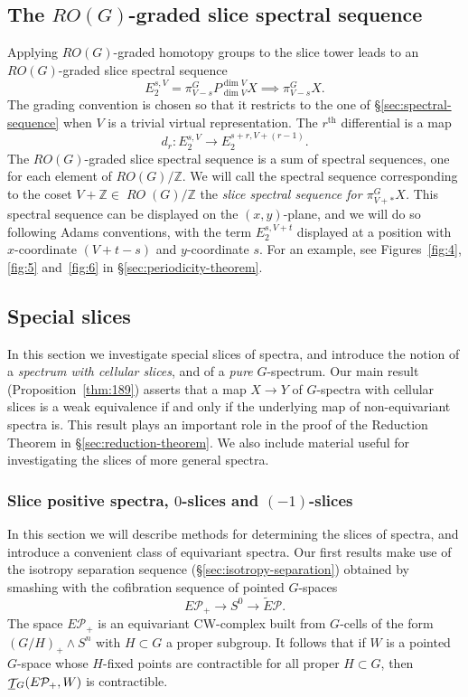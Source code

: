 \documentclass{amsart}
\theoremstyle{definition}
\theoremstyle{remark}
\newcommand{\Z}{{\mathbb Z}}
\newcommand{\slc}[2]{P_{#1}^{#1}#2}
\DeclareMathOperator{\spaces}{\mathcal T}
\newcommand{\gspaces}[1]{\underline{\spaces\mkern-4mu}\mkern4mu_{\!#1}}
\DeclareMathOperator{\RO}{\mathit {RO}}
\newcommand{\pfamily}{\mathcal P}
\begin{document}
\subsection{The $RO(G)$-graded slice spectral sequence}
\label{sec:rog-graded-slice}
Applying $RO(G)$-graded homotopy groups to the slice
tower leads to an $RO(G)$-graded slice spectral sequence
\[
E_{2}^{s,V}= \pi^{G}_{V-s}\slc{\dim V}{X} \implies \pi^{G}_{V-s}X.
\]
The grading convention is chosen so that it restricts to the one of
\S\ref{sec:spectral-sequence} when $V$ is a trivial virtual
representation.  The $r^{\text{th}}$ differential is a map
\[
d_{r}:E_{2}^{s,V} \to E_{2}^{s+r,V+(r-1)}.
\]
The $RO(G)$-graded slice spectral sequence is a sum of spectral
sequences, one for each element of $RO(G)/\Z$.  We will call the
spectral sequence corresponding to the coset $V+\Z\in\RO(G)/\Z$ the
{\em slice spectral sequence for $\pi^{G}_{V+\ast}X$.}  This spectral
sequence can be displayed on the $(x,y)$-plane, and we will do so
following Adams conventions, with the term $E_{2}^{s,V+t}$ displayed
at a position with $x$-coordinate $(V+t-s)$ and $y$-coordinate $s$.
For an example, see Figures~\ref{fig:4}, \ref{fig:5} and~\ref{fig:6}
in \S\ref{sec:periodicity-theorem}.  

\subsection{Special slices} 
\label{sec:special-slices}

In this section we investigate special slices of spectra, and
introduce the notion of a {\em spectrum with cellular slices}, and of
a {\em pure} $G$-spectrum.  Our main result
(Proposition~\ref{thm:189}) asserts that a map $X\to Y$ of $G$-spectra
with cellular slices is a weak equivalence if and only if the
underlying map of non-equivariant spectra is.  This result plays an
important role in the proof of the Reduction Theorem in
\S\ref{sec:reduction-theorem}.  We also include material useful for
investigating the slices of more general spectra.


\subsubsection{Slice positive spectra, $0$-slices and $(-1)$-slices}
\label{sec:slice-posit-spectra}

In this section we will describe methods for determining the slices of
spectra, and introduce a convenient class of equivariant spectra.  Our
first results make use of the isotropy separation sequence
(\S\ref{sec:isotropy-separation}) obtained by smashing with the
cofibration sequence of pointed $G$-spaces
\[
E\pfamily_{+}\to S^{0} \to \tilde E\pfamily.
\]
The space $E\pfamily_{+}$ is an equivariant CW-complex built from
$G$-cells of the form $(G/H)_{+}\wedge S^{n}$ with $H\subset G$ a
proper subgroup.  It follows that if $W$ is a pointed $G$-space whose
$H$-fixed points are contractible for all proper $H\subset G$, then
$\gspaces{G}(E\pfamily_{+}, W)$ is contractible.
\end{document}
